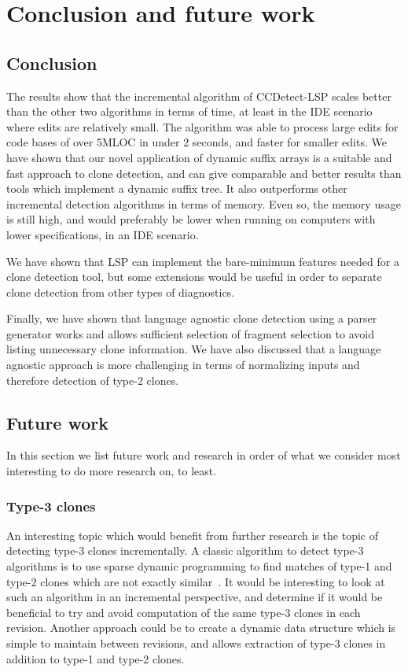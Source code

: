 \chapter{Conclusion and future work}

\section{Conclusion}

The results show that the incremental algorithm of CCDetect-LSP scales better than the
other two algorithms in terms of time, at least in the IDE scenario where edits are
relatively small. The algorithm was able to process large edits for code bases of over
5MLOC in under 2 seconds, and faster for smaller edits. We have shown that our novel
application of dynamic suffix arrays is a suitable and fast approach to clone detection,
and can give comparable and better results than tools which implement a dynamic suffix
tree. It also outperforms other incremental detection algorithms in terms of memory. Even
so, the memory usage is still high, and would preferably be lower when running on
computers with lower specifications, in an IDE scenario. 

We have shown that LSP can implement the bare-minimum features needed for a clone
detection tool, but some extensions would be useful in order to separate clone detection
from other types of diagnostics.

Finally, we have shown that language agnostic clone detection using a parser generator
works and allows sufficient selection of fragment selection to avoid listing unnecessary
clone information. We have also discussed that a language agnostic approach is more
challenging in terms of normalizing inputs and therefore detection of type-2 clones.

\section{Future work}

In this section we list future work and research in order of what we consider
most interesting to do more research on, to least.

\subsection*{Type-3 clones}

An interesting topic which would benefit from further research is the topic of detecting
type-3 clones incrementally. A classic algorithm to detect type-3 algorithms is to use
sparse dynamic programming to find matches of type-1 and type-2 clones which are not
exactly similar~\cite{BakerSparseDynamicProgramming}. It would be interesting to look at
such an algorithm in an incremental perspective, and determine if it would be beneficial
to try and avoid computation of the same type-3 clones in each revision. Another approach
could be to create a dynamic data structure which is simple to maintain between revisions,
and allows extraction of type-3 clones in addition to type-1 and type-2 clones. 

